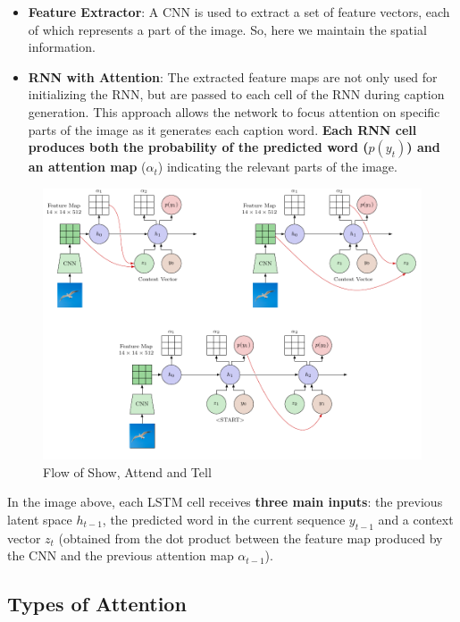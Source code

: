 \begin{itemize}
    \item \textbf{Feature Extractor}: A CNN is used to extract a set of feature vectors, each of which represents a part of the image. So, here we maintain the spatial information.
    \item \textbf{RNN with Attention}: The extracted feature maps are not only used for initializing the RNN, but are passed to each cell of the RNN during caption generation. This approach allows the network to focus attention on specific parts of the image as it generates each caption word. \textbf{Each RNN cell produces both the probability of the predicted word ($p(y_t)$) and an attention map }($\alpha_t$) indicating the relevant parts of the image.
\end{itemize}

\begin{figure}[!htbp]
    \centering
    \includegraphics[width=\linewidth]{tikz/chapter7 - Show, Attend and Tell.pdf}
    \caption{Flow of Show, Attend and Tell}
\end{figure}

In the image above, each LSTM cell receives \textbf{three main inputs}: the previous latent space $h_{t-1}$, the predicted word in the current sequence $ y_{t-1} $ and a context vector $ z_{t} $ (obtained from the dot product between the feature map produced by the CNN and the previous attention map $\alpha_{t-1}$). 

\subsection{Types of Attention}

